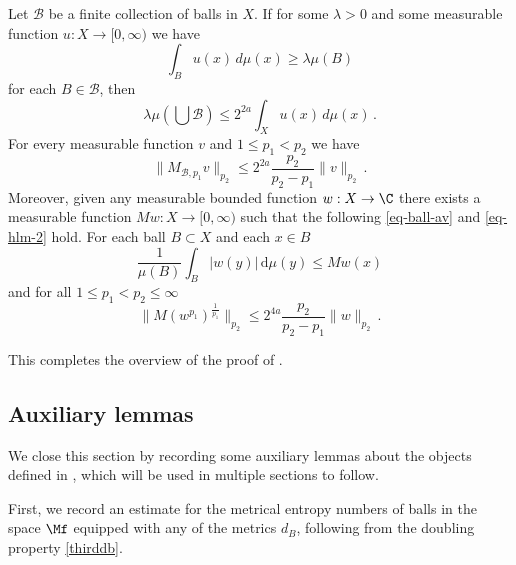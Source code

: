 \begin{proposition}
\label{Hardy-Littlewood}
\leanok
{}
   Let $\mathcal{B}$ be a finite collection of balls in $X$.
If for some $\lambda>0$ and some measurable function $u:X\to [0,\infty)$ we have
\begin{equation}\label{eq-ball-assumption}
\int_{B} u(x)\, d\mu(x)\ge \lambda \mu(B)
\end{equation}
for each $B\in \mathcal{B}$, then
\begin{equation}\label{eq-besico}
    \lambda \mu(\bigcup \mathcal{B}) \le 2^{2a}\int_X u(x)\, d\mu(x)\, .
\end{equation}
For every measurable function $v$
and $1\le p_1<p_2$ we have
\begin{equation}\label{eq-hlm}
    \|M_{\mathcal{B},p_1} v\|_{p_2}\le 2^{2a}\frac{p_2}{p_2-p_1} \|v\|_{p_2}\, .
\end{equation}
Moreover, given any measurable bounded function $w: X \to \C$ there exists a measurable function $Mw: X \to [0, \infty)$ such that the following \eqref{eq-ball-av} and \eqref{eq-hlm-2} hold. For each ball $B \subset X$ and each $x \in B$
\begin{equation}
    \label{eq-ball-av}
    \frac{1}{\mu(B)} \int_{B} |w(y)| \, \mathrm{d}\mu(y) \le Mw(x)
\end{equation}
and for all $1 \le p_1 < p_2 \le \infty$
\begin{equation}
    \label{eq-hlm-2}
    \|M(w^{p_1})^{\frac{1}{p_1}}\|_{p_2} \le 2^{4a} \frac{p_2}{p_2-p_1}\|w\|_{p_2}\,.
\end{equation}

\end{proposition}

This completes the overview of the proof of .

\subsection{Auxiliary lemmas}
\label{global-auxiliary-lemmas}
We close this section by recording some auxiliary lemmas about the objects defined in , which will be used in multiple sections to follow.

First, we record an estimate for the metrical entropy numbers of balls in the space $\Mf$ equipped with any of the metrics $d_B$, following from the doubling property \eqref{thirddb}.

